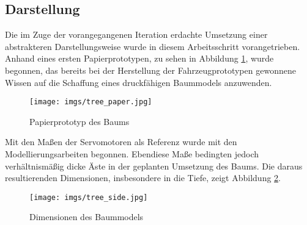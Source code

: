 \documentclass[.../Dokumentation.tex]{subfiles}
\begin{document}
\subsection{Darstellung}\label{sec-ita2-visualization}
Die im Zuge der vorangegangenen Iteration erdachte Umsetzung einer abstrakteren 
Darstellungsweise wurde in diesem Arbeitsschritt vorangetrieben.\\
Anhand eines ersten Papierprototypen, zu sehen in Abbildung 
\ref{fig-tree-paper}, wurde begonnen, das bereits bei der Herstellung der 
Fahrzeugprototypen gewonnene Wissen auf die Schaffung eines druckfähigen 
Baummodels anzuwenden.
\begin{figure}[H]
\begin{center}
    \texttt{[image: imgs/tree\_paper.jpg]}
    \caption{Papierprototyp des Baums}
    \label{fig-tree-paper}
\end{center}
\end{figure}
\noindent
Mit den Maßen der Servomotoren als Referenz wurde mit den Modellierungsarbeiten 
begonnen. Ebendiese Maße bedingten jedoch verhältnismäßig dicke Äste in der 
geplanten Umsetzung des Baums. 
Die daraus resultierenden Dimensionen, insbesondere in die Tiefe, zeigt 
Abbildung \ref{fig-tree-side}.
\begin{figure}[H]
\begin{center}
    \texttt{[image: imgs/tree\_side.jpg]}
    \caption{Dimensionen des Baummodels}
    \label{fig-tree-side}
\end{center}
\end{figure}
\end{document}
